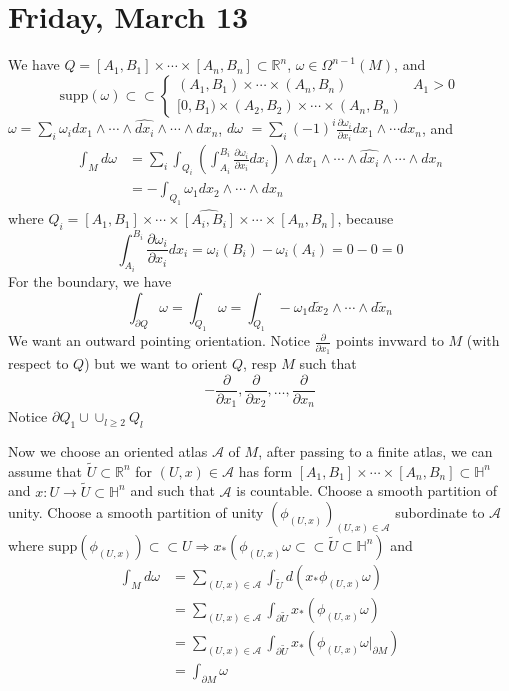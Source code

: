 \documentclass{article}
\begin{document}
\section{Friday, March 13}
We have $Q = [A_1, B_1] \times \cdots \times [A_n, B_n] \subset \mathbb{R}^n$, $\omega \in \Omega^{n-1}(M)$, and 
\[
\text{supp}(\omega) \subset \subset \begin{cases}
(A_1, B_1) \times \cdots \times (A_n, B_n) & A_1 > 0 \\
[0, B_1) \times (A_2, B_2) \times \cdots \times (A_n, B_n)
\end{cases}
\]
$\omega = \sum_i \omega_i dx_1 \wedge \cdots \wedge \hat{dx_i} \wedge \cdots \wedge dx_n$, $d\omega$ $= \sum_i (-1)^i\frac{\partial \omega_i}{\partial x_i} dx_1 \wedge \cdots dx_n$, and
\begin{align*}
\int_M d \omega & = \sum_i \int_{Q_i}(\int_{A_i}^{B_i} \frac{\partial \omega_i}{\partial x_i} dx_i )\wedge dx_1 \wedge \cdots \wedge \hat{dx_i} \wedge \cdots \wedge dx_n\\
& = -\int_{Q_1} \omega_1 dx_2 \wedge \cdots \wedge dx_n
\end{align*}
where $Q_i = [A_1, B_1] \times \cdots \times \hat{[A_i, B_i]} \times \cdots \times [A_n, B_n]$, because
\[
\int_{A_i}^{B_i} \frac{\partial \omega_i}{\partial x_i}dx_i = \omega_i(B_i) - \omega_i(A_i) = 0 - 0 = 0
\]
For the boundary, we have 
\[
\int_{\partial Q} \omega = \int_{Q_1} \omega = \int_{Q_1} -\omega_1 d\tilde{x}_2 \wedge \cdots \wedge d\tilde{x}_n
\]
We want an outward pointing orientation. Notice $\frac{\partial}{\partial x_1}$ points invward to $M$ (with respect to $Q$) but we want to orient $Q$, resp $M$ such that 
\[
-\frac{\partial}{\partial x_1}, \frac{\partial}{\partial x_2}, \ldots, \frac{\partial}{\partial x_n}
\]
Notice $\partial Q_1 \cup \cup_{l \geq 2} Q_l$

Now we choose an oriented atlas $\mathscr{A}$ of $M$, after passing to a finite atlas, we can assume that $\tilde{U} \subset \mathbb{R}^n$ for $(U,x) \in \mathscr{A}$ has form $[A_1, B_1] \times \cdots \times[A_n, B_n] \subset \mathbb{H}^n$ and $x: U \to \tilde{U} \subset \mathbb{H}^n$ and such that $\mathscr{A}$ is countable. Choose a smooth partition of unity. Choose a smooth partition of unity $(\phi_{(U,x)})_{(U,x) \in \mathscr{A}}$ subordinate to $\mathscr{A}$ where $\text{supp}(\phi_{(U,x)}) \subset \subset U \Rightarrow x_*(\phi_{(U,x)} \omega \subset \subset \tilde{U} \subset \mathbb{H}^n)$ and
\begin{align*}
\int_M d\omega &= \sum_{(U,x) \in \mathscr{A}} \int_{\tilde{U}}d(x_*\phi_{(U,x)} \omega) \\
&= \sum_{(U,x) \in \mathscr{A}} \int_{\partial \tilde{U}} x_*(\phi_{(U,x)}\omega)\\
&= \sum_{(U,x) \in \mathscr{A}} \int_{\partial \tilde{U}} x_*(\phi_{(U,x)}\omega|_{\partial M}) \\
&= \int_{\partial M} \omega
\end{align*}
\end{document}
